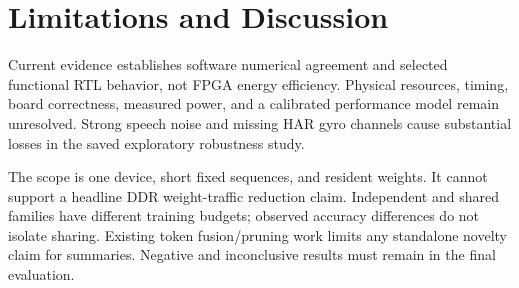 \section{Limitations and Discussion}
\label{sec:limitations}
Current evidence establishes software numerical agreement and selected
functional RTL behavior, not FPGA energy efficiency. Physical resources,
timing, board correctness, measured power, and a calibrated performance model
remain unresolved. Strong speech noise and missing HAR gyro channels cause
substantial losses in the saved exploratory robustness study.

The scope is one device, short fixed sequences, and resident weights. It cannot
support a headline DDR weight-traffic reduction claim. Independent and shared
families have different training budgets; observed accuracy differences do not
isolate sharing. Existing token fusion/pruning work limits any standalone
novelty claim for summaries. Negative and inconclusive results must remain in
the final evaluation.
